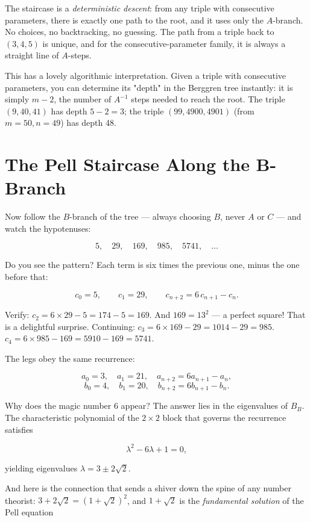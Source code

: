 The staircase is a \textit{deterministic descent}: from any triple with consecutive parameters, there is exactly one path to the root, and it uses only the $A$-branch. No choices, no backtracking, no guessing. The path from a triple back to $(3, 4, 5)$ is unique, and for the consecutive-parameter family, it is always a straight line of $A$-steps.

This has a lovely algorithmic interpretation. Given a triple with consecutive parameters, you can determine its "depth" in the Berggren tree instantly: it is simply $m - 2$, the number of $A^{-1}$ steps needed to reach the root. The triple $(9, 40, 41)$ has depth $5 - 2 = 3$; the triple $(99, 4900, 4901)$ (from $m = 50, n = 49$) has depth 48.


\bigskip


\section{The Pell Staircase Along the B-Branch}

Now follow the $B$-branch of the tree --- always choosing $B$, never $A$ or $C$ --- and watch the hypotenuses:

\[
5, \quad 29, \quad 169, \quad 985, \quad 5741, \quad \ldots
\]

Do you see the pattern? Each term is six times the previous one, minus the one before that:

\[
c_0 = 5, \qquad c_1 = 29, \qquad c_{n+2} = 6\,c_{n+1} - c_n.
\]

Verify: $c_2 = 6 \times 29 - 5 = 174 - 5 = 169$. And $169 = 13^2$ --- a perfect square! That is a delightful surprise. Continuing: $c_3 = 6 \times 169 - 29 = 1014 - 29 = 985$. $c_4 = 6 \times 985 - 169 = 5910 - 169 = 5741$.

The legs obey the same recurrence:

\[
a_0 = 3,\quad a_1 = 21,\quad a_{n+2} = 6a_{n+1} - a_n,
\]
\[
b_0 = 4,\quad b_1 = 20,\quad b_{n+2} = 6b_{n+1} - b_n.
\]

Why does the magic number $6$ appear? The answer lies in the eigenvalues of $B_B$. The characteristic polynomial of the $2 \times 2$ block that governs the recurrence satisfies

\[
\lambda^2 - 6\lambda + 1 = 0,
\]

yielding eigenvalues $\lambda = 3 \pm 2\sqrt{2}$.

And here is the connection that sends a shiver down the spine of any number theorist: $3 + 2\sqrt{2} = (1 + \sqrt{2})^2$, and $1 + \sqrt{2}$ is the \textit{fundamental solution} of the Pell equation

